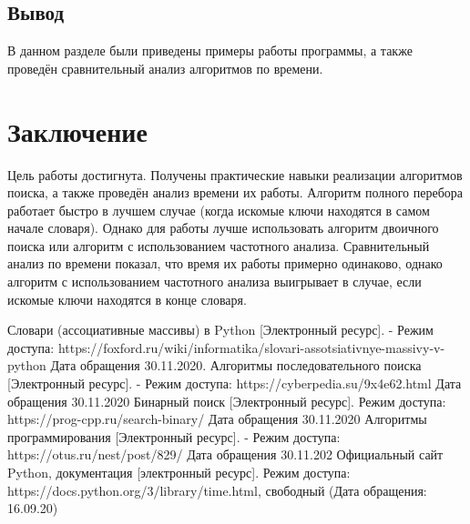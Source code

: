 \documentclass[12pt]{report}
\begin{document}
\newpage
\section{Вывод}
В данном разделе были приведены примеры работы программы, а также проведён сравнительный анализ алгоритмов по времени.

\chapter*{Заключение}
Цель работы достигнута. Получены практические навыки реализации алгоритмов поиска, а также проведён анализ времени их работы. Алгоритм полного перебора работает быстро в лучшем случае (когда искомые ключи находятся в самом начале словаря). Однако для работы лучше использовать алгоритм двоичного поиска или алгоритм с использованием частотного анализа. Сравнительный анализ по времени показал, что время их работы примерно одинаково, однако алгоритм с использованием частотного анализа выигрывает в случае, если искомые ключи находятся в конце словаря.

\begin{thebibliography}{2}
	 Словари (ассоциативные массивы) в Python [Электронный ресурс]. - Режим доступа: https://foxford.ru/wiki/informatika/slovari-assotsiativnye-massivy-v-python Дата обращения 30.11.2020.
	 Алгоритмы последовательного поиска [Электронный ресурс]. - Режим доступа: https://cyberpedia.su/9x4e62.html Дата обращения 30.11.2020
	 Бинарный поиск [Электронный ресурс]. Режим доступа: https://prog-cpp.ru/search-binary/ Дата обращения 30.11.2020
	 Алгоритмы программирования [Электронный ресурс]. - Режим доступа: https://otus.ru/nest/post/829/ Дата обращения 30.11.202
	 Официальный сайт Python, документация [электронный ресурс]. Режим доступа: https://docs.python.org/3/library/time.html, свободный (Дата обращения: 16.09.20)
\end{thebibliography}
\end{document}
